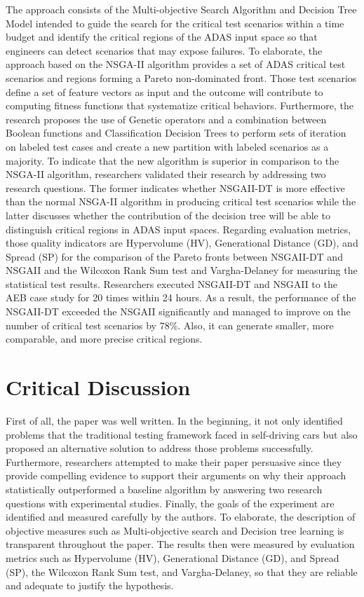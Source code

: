 \documentclass[10pt,a4paper]{report}
\begin{document}
The approach consists of the Multi-objective Search Algorithm and Decision Tree Model intended to guide the search for the critical test scenarios within a time budget and identify the critical regions of the ADAS input space so that engineers can detect scenarios that may expose failures. 
%
To elaborate, the approach based on the NSGA-II algorithm provides a set of ADAS critical test scenarios and regions forming a Pareto non-dominated front.
%
Those test scenarios define a set of feature vectors as input and the outcome will contribute to computing fitness functions that systematize critical behaviors.
%
Furthermore, the research proposes the use of Genetic operators and
%
a combination between Boolean functions and Classification Decision Trees to perform sets of iteration on labeled test cases and create a new partition with labeled scenarios as a majority.
% 
To indicate that the new algorithm is superior in comparison to the NSGA-II algorithm, researchers validated their research by addressing two research questions.
%
The former indicates whether NSGAII-DT is more effective than the normal NSGA-II algorithm in producing critical test scenarios while the latter discusses whether the contribution of the decision tree will be able to distinguish critical regions in ADAS input spaces.
%
Regarding evaluation metrics, those quality indicators are Hypervolume (HV), Generational Distance (GD), and Spread (SP) for the comparison of the Pareto fronts between NSGAII-DT and NSGAII and 
% 
the Wilcoxon Rank Sum test and Vargha-Delaney for measuring the statistical test results.
%
Researchers executed NSGAII-DT and NSGAII to the AEB case study for 20 times within 24 hours.
%
As a result, the performance of the NSGAII-DT exceeded the NSGAII significantly and managed to improve on the number of critical test scenarios by 78\%.
% 
Also, it can generate smaller, more comparable, and more precise critical regions.



\section{Critical Discussion}
First of all, the paper was well written. In the beginning, it not only identified problems that the traditional testing framework faced in self-driving cars but also proposed an alternative solution to address those problems successfully.
%
Furthermore, researchers attempted to make their paper persuasive since they provide compelling evidence to support their arguments on why their approach statistically outperformed a baseline algorithm by answering two research questions with experimental studies.  
%
Finally, the goals of the experiment are identified and measured carefully by the authors.
%
To elaborate, the description of objective measures such as Multi-objective search and Decision tree learning is transparent throughout the paper. 
%
The results then were measured by evaluation metrics such as Hypervolume (HV), Generational Distance (GD), and Spread (SP), the Wilcoxon Rank Sum test, and Vargha-Delaney, so that they are reliable and adequate to justify the hypothesis.
%
\end{document}
